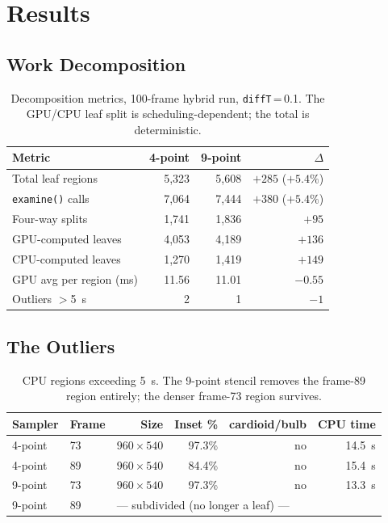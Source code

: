 \documentclass[
	english,
	letterpaper, oneside
]{article}
\begin{document}
\section{Results}

\subsection{Work Decomposition}

\begin{table}[H]
    \centering
    \caption{Decomposition metrics, 100-frame hybrid run, \texttt{diffT}\,=\,0.1.
             The GPU/CPU leaf split is scheduling-dependent; the total is
             deterministic.}
    \label{tab:decomp}
    \begin{tabular}{lrrr}
        \hline
        Metric & 4-point & 9-point & $\Delta$ \\
        \hline
        Total leaf regions       & 5{,}323 & 5{,}608 & $+285$ ($+5.4\%$) \\
        \texttt{examine()} calls & 7{,}064 & 7{,}444 & $+380$ ($+5.4\%$) \\
        Four-way splits          & 1{,}741 & 1{,}836 & $+95$ \\
        \quad GPU-computed leaves & 4{,}053 & 4{,}189 & $+136$ \\
        \quad CPU-computed leaves & 1{,}270 & 1{,}419 & $+149$ \\
        GPU avg per region (ms)  & 11.56   & 11.01   & $-0.55$ \\
        Outliers $>$5~s          & 2       & 1       & $-1$ \\
        \hline
    \end{tabular}
\end{table}

\subsection{The Outliers}

\begin{table}[H]
    \centering
    \caption{CPU regions exceeding 5~s. The 9-point stencil removes the
             frame-89 region entirely; the denser frame-73 region survives.}
    \label{tab:outliers}
    \begin{tabular}{llrrrr}
        \hline
        Sampler & Frame & Size & Inset \% & cardioid/bulb & CPU time \\
        \hline
        4-point & 73 & $960\times540$ & 97.3\% & no & 14.5~s \\
        4-point & 89 & $960\times540$ & 84.4\% & no & 15.4~s \\
        9-point & 73 & $960\times540$ & 97.3\% & no & 13.3~s \\
        9-point & 89 & \multicolumn{4}{l}{--- subdivided (no longer a leaf) ---} \\
        \hline
    \end{tabular}
\end{table}
\end{document}

